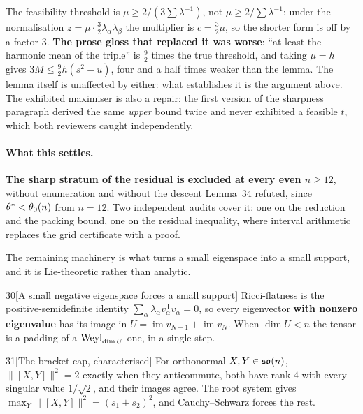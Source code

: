 \begin{remarkstar}
The feasibility threshold is $\mu\ge2/(3\sum\lambda^{-1})$, not $\mu\ge2/\sum\lambda^{-1}$: under the normalisation $z=\mu\cdot\tfrac32\lambda_\alpha\lambda_\beta$ the multiplier is $c=\tfrac32\mu$, so the shorter form is off by a factor $3$. \textbf{The prose gloss that replaced it was worse}: ``at least the harmonic mean of the triple'' is $\tfrac92$ times the true threshold, and taking $\mu=h$ gives $3M\le\tfrac92h(s^2-u)$, four and a half times weaker than the lemma. The lemma itself is unaffected by either: what establishes it is the argument above. The exhibited maximiser is also a repair: the first version of the sharpness paragraph derived the same \emph{upper} bound twice and never exhibited a feasible $t$, which both reviewers caught independently.
\end{remarkstar}

\paragraph{What this settles.} \textbf{The sharp stratum of the residual is excluded at every even $n\ge12$}, without enumeration and without the descent Lemma~34 refuted, since $\theta^{*}<\theta_0(n)$ from $n=12$. Two independent audits cover it: one on the reduction and the packing bound, one on the residual inequality, where interval arithmetic replaces the grid certificate with a proof.

The remaining machinery is what turns a small eigenspace into a small support, and it is Lie-theoretic rather than analytic.

\begin{Lem}{30}[A small negative eigenspace forces a small support]
Ricci-flatness is the positive-semidefinite identity $\sum_\alpha\lambda_\alpha v_\alpha^{\mathsf T}v_\alpha=0$, so every eigenvector \textbf{with nonzero eigenvalue} has its image in $U=\operatorname{im}v_{N-1}+\operatorname{im}v_N$. When $\dim U<n$ the tensor is a padding of a $\mathrm{Weyl}_{\dim U}$ one, in a single step.
\end{Lem}

\begin{Lem}{31}[The bracket cap, characterised]
For orthonormal $X,Y\in\mathfrak{so}(n)$, $\|[X,Y]\|^2=2$ exactly when they anticommute, both have rank $4$ with every singular value $1/\sqrt2$, and their images agree. The root system gives $\max_Y\|[X,Y]\|^2=(s_1+s_2)^2$, and Cauchy--Schwarz forces the rest.
\end{Lem}

